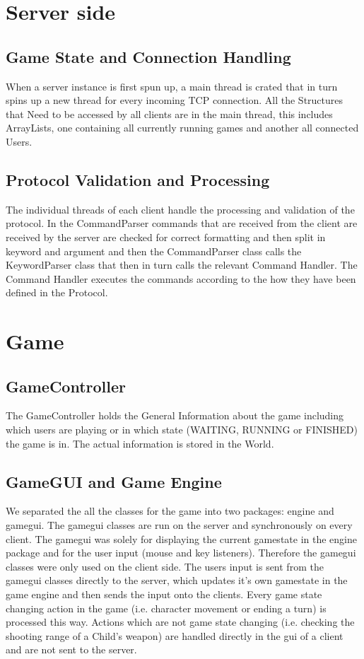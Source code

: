 \documentclass[11pt,a4paper]{article}
\begin{document}
	\section{Server side}
		\subsection{Game State and Connection Handling}
		When a server instance is first spun up, a main thread is crated that in turn spins up a new thread for every incoming TCP connection. All the Structures that Need to be accessed by all clients are in the main thread, this includes ArrayLists, one containing all currently running games and another all connected Users.
		\subsection{Protocol Validation and Processing}
		The individual threads of each client handle the processing and validation of the protocol. In the CommandParser commands that are received from the client are received by the server are checked for correct formatting and then split in keyword and argument and then the CommandParser class calls the KeywordParser class that then in turn calls the relevant Command Handler. The Command Handler executes the commands according to the how they have been defined in the Protocol.
		\clearpage 
	\section{Game}
		\subsection{GameController}
		The GameController holds the General Information about the game including which users are playing or in which state (WAITING, RUNNING or FINISHED) the game is in. The actual information is stored in the World.
		\subsection{GameGUI and Game Engine}
		We separated the all the classes for the game into two packages: engine and gamegui. The gamegui classes are run on the server and synchronously on every client. The gamegui was solely for displaying the current gamestate in the engine package and for the user input (mouse and key listeners). Therefore the gamegui classes were only used on the client side. The users input is sent from the gamegui classes directly to the server, which updates it's own gamestate in the game engine and then sends the input onto the clients. Every game state changing action in the game (i.e. character movement or ending a turn) is processed this way. Actions which are not game state changing (i.e. checking the shooting range of a Child's weapon) are handled directly in the gui of a client and are not sent to the server.
\end{document}
